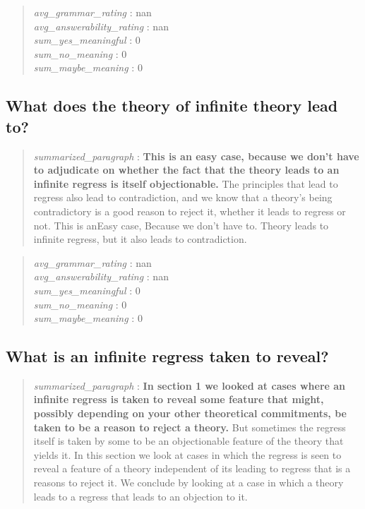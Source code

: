 \begin{quote}
\emph{avg\_grammar\_rating} : nan\\
\emph{avg\_answerability\_rating} : nan\\
\emph{sum\_yes\_meaningful} : 0\\
\emph{sum\_no\_meaning} : 0\\
\emph{sum\_maybe\_meaning} : 0
\end{quote}

\hypertarget{what-does-the-theory-of-infinite-theory-lead-to}{%
\subsection{What does the theory of infinite theory lead
to?}\label{what-does-the-theory-of-infinite-theory-lead-to}}

\begin{quote}
\emph{summarized\_paragraph} : \textbf{This is an easy case, because we
don't have to adjudicate on whether the fact that the theory leads to an
infinite regress is itself objectionable.} The principles that lead to
regress also lead to contradiction, and we know that a theory's being
contradictory is a good reason to reject it, whether it leads to regress
or not. This is anEasy case, Because we don't have to. Theory leads to
infinite regress, but it also leads to contradiction.
\end{quote}

\begin{quote}
\emph{avg\_grammar\_rating} : nan\\
\emph{avg\_answerability\_rating} : nan\\
\emph{sum\_yes\_meaningful} : 0\\
\emph{sum\_no\_meaning} : 0\\
\emph{sum\_maybe\_meaning} : 0
\end{quote}

\hypertarget{what-is-an-infinite-regress-taken-to-reveal}{%
\subsection{What is an infinite regress taken to
reveal?}\label{what-is-an-infinite-regress-taken-to-reveal}}

\begin{quote}
\emph{summarized\_paragraph} : \textbf{In section 1 we looked at cases
where an infinite regress is taken to reveal some feature that might,
possibly depending on your other theoretical commitments, be taken to be
a reason to reject a theory.} But sometimes the regress itself is taken
by some to be an objectionable feature of the theory that yields it. In
this section we look at cases in which the regress is seen to reveal a
feature of a theory independent of its leading to regress that is a
reasons to reject it. We conclude by looking at a case in which a theory
leads to a regress that leads to an objection to it.
\end{quote}

